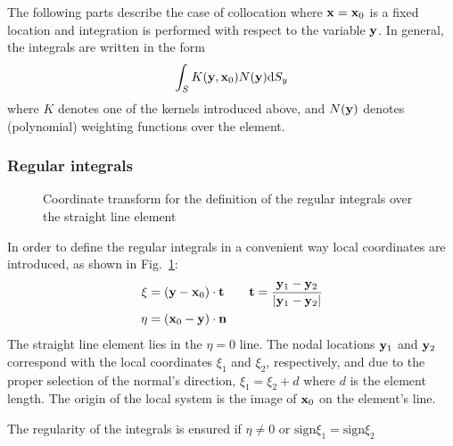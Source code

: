\documentclass[a4paper,11pt]{article}
\newcommand{\td}{\mathrm{d}}
\newcommand{\sign}{\mathrm{sign}}
\begin{document}
The following parts describe the case of collocation where ${\bf x}={\bf x}_0$ is a fixed location and integration is performed with respect to the variable ${\bf y}$. In general, the integrals are written in the form
%
\begin{equation}
\int_S K({\bf y}, {\bf x}_0) N({\bf y}) \td S_y
\end{equation}
%
where $K$ denotes one of the kernels introduced above, and $N({\bf y})$ denotes (polynomial) weighting functions over the element.

\subsubsection{Regular integrals}

\begin{figure}
\center
{}
\caption{Coordinate transform for the definition of the regular integrals over the straight line element}
\label{fig:regular_local}
\end{figure}

In order to define the regular integrals in a convenient way local coordinates are introduced, as shown in Fig.~\ref{fig:regular_local}:
%
\begin{align}
\xi &= ({\bf y} - {\bf x}_0) \cdot {\bf t} \qquad {\bf t} = \frac{{\bf y}_1 - {\bf y}_2}{|{\bf y}_1 - {\bf y}_2|} \nonumber \\
\eta &= ({\bf x}_0 - {\bf y}) \cdot {\bf n}
\end{align}
%
The straight line element lies in the $\eta = 0$ line. The nodal locations ${\bf y}_1$ and ${\bf y}_2$ correspond with the local coordinates $\xi_1$ and $\xi_2$, respectively, and due to the proper selection of the normal's direction, $\xi_1 = \xi_2 + d$ where $d$ is the element length. The origin of the local system is the image of ${\bf x}_0$ on the element's line.

The regularity of the integrals is ensured if $\eta \ne 0$ or $\sign \xi_1 = \sign \xi_2$
\end{document}
